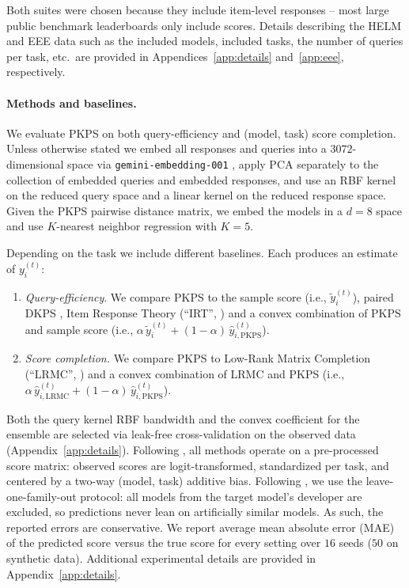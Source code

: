 \documentclass{article}
\theoremstyle{definition}
\theoremstyle{plain}
\newcommand{\PKPS}{PKPS\xspace}
\begin{document}
Both suites were chosen because they include item-level responses -- most large
public benchmark leaderboards only include scores.
Details describing the HELM and EEE data such as the included models, included
tasks, the number of queries per task, etc.\ are provided in
Appendices~\ref{app:details} and~\ref{app:eee}, respectively.

\paragraph{Methods and baselines.} We evaluate \PKPS on both query-efficiency and
(model, task) score completion.
Unless otherwise stated we embed all responses and queries into a $3072$-dimensional
space via \texttt{gemini-embedding-001} \citep{lee2025gemini}, apply PCA separately to the collection of embedded queries and embedded responses, and use an RBF kernel on the
reduced query space and a linear kernel on the reduced response space.
Given the \PKPS pairwise distance matrix, we embed the models in a $d = 8$ space and
use $K$-nearest neighbor regression with $K = 5$.

Depending on the task we include different baselines. Each produces an estimate of
$y_{i}^{(t)}$:
\begin{enumerate}[wide, labelwidth=1pt, labelindent=12pt]
    \item \emph{Query-efficiency}. We compare \PKPS to the sample score (i.e.,
    $\tilde{y}_{i}^{(t)}$), paired DKPS \citep{dkps_qeff}, Item Response Theory
    (``IRT'', \citealp{polo2024tinybenchmarks}) and a convex combination
    of \PKPS and sample score (i.e.,
    $\alpha\,\tilde{y}_{i}^{(t)}+(1-\alpha)\,\hat{y}^{(t)}_{i,\mathrm{PKPS}}$).
    \item \emph{Score completion.} We compare \PKPS to Low-Rank Matrix Completion
    (``LRMC'', \citealp{benchpress}) and a convex combination of LRMC and \PKPS
    (i.e., $\alpha\,\hat{y}^{(t)}_{i,\mathrm{LRMC}}+(1-\alpha)\,\hat{y}^{(t)}_{i,\mathrm{PKPS}}$).
\end{enumerate}
Both the query kernel RBF bandwidth and the convex coefficient for the ensemble are
selected via leak-free cross-validation on the observed data (Appendix~\ref{app:details}).
Following \citet{benchpress}, all methods operate on a pre-processed score matrix:
observed scores are logit-transformed, standardized per task, and centered by a
two-way (model, task) additive bias.
Following \citet{dkps_qeff}, we use the leave-one-family-out protocol: all models from the
target model's developer are excluded, so predictions never lean on artificially similar models. As such, the reported errors are conservative.
We report average mean absolute error (MAE) of the predicted score versus the true
score for every setting over $16$ seeds ($50$ on synthetic data).
Additional experimental details are provided in Appendix~\ref{app:details}.
\end{document}
